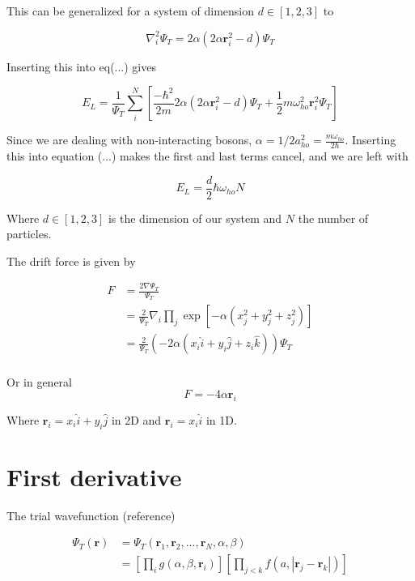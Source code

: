 \documentclass[
    a4paper, aps, twocolumn, floatfix, superscriptaddress,
    nofootinbib]{revtex4-1}
\begin{document}
\begin{appendices}
This can be generalized for a system of dimension $d\in [1,2,3]$ to

\begin{equation}
\nabla_i^2 \Psi_T = 2\alpha \left(2\alpha \boldsymbol{r}_i^2 -d\right) \Psi_T
\end{equation}

Inserting this into eq(...) gives 

\begin{equation}
    E_L = \frac{1}{\Psi_T} \sum_i^N \left[\frac{-\hbar^2}{2m} 2\alpha(2\alpha \boldsymbol{r}_i^2 - d) \Psi_T + \frac{1}{2}m \omega_{ho}^2 \boldsymbol{r}_i^2 \Psi_T\right]
\end{equation}

Since we are dealing with non-interacting bosons, $\alpha = 1/2 a_{ho}^2 = \frac{m\omega_{ho}}{2\hbar}$. Inserting this into equation (...) makes the first and last terms cancel, and we are left with


\begin{equation}
    E_L = \frac{d}{2} \hbar \omega_{ho} N
\end{equation}

Where $d\in [1,2,3]$ is the dimension of our system and $N$ the number of particles. 


The drift force is given by 

\begin{align}
    F &= \frac{2\nabla \Psi_T}{\Psi_T}\\
    &= \frac{2}{\Psi_T}\nabla_i\prod_j \exp[-\alpha(x_j^2+y_j^2+z_j^2)] \\ 
    &= \frac{2}{\Psi_T} \left(-2\alpha (x_i \hat{i}+ y_i \hat{j} + z_i \hat{k})\right) \Psi_T \\
\end{align}

Or in general 
\begin{equation}
    F =-4\alpha \boldsymbol{r}_i
\end{equation}

Where $\boldsymbol{r}_i = x_i \hat{i} + y_i \hat{j}$ in 2D and $\boldsymbol{r}_i = x_i \hat{i}$ in 1D.

\section{First derivative}


The trial wavefunction (reference)

\begin{align}
    \Psi_T(\boldsymbol{r}) &= \Psi_T(\boldsymbol{r}_1,\boldsymbol{r}_2,...,\boldsymbol{r}_N,\alpha,\beta) \\
    &= \left[\prod_i g(\alpha,\beta,\boldsymbol{r}_i)\right] \left[\prod_{j<k} f(a,|\boldsymbol{r}_j - \boldsymbol{r}_k|)\right]
\end{align}


\end{appendices}
\end{document}
